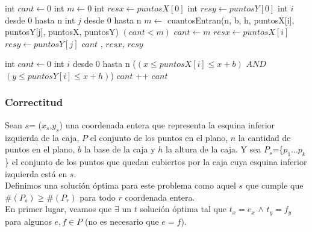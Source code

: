 \begin{algorithm}[H]
\caption{} 
\begin{codebox}
\li int $cant \gets 0$
\li int $m \gets 0$
\li int $resx \gets puntosX[0]$
\li int $resy \gets puntosY[0]$
\li \For int $i$ desde 0 hasta n \Do
\li		\For int $j$ desde 0 hasta n \Do
\li 		$m \gets $ cuantosEntran(n, b, h, puntosX[i], puntosY[j], puntosX, puntosY)
\li 		\If $(cant<m)$ 
\li				\Then   $cant \gets m$
\li 					$resx \gets puntosX[i]$
\li 					$resy \gets puntosY[j]$
				\End
			\End
		\End
	\End
\li \Return $cant$ , $resx$, $resy$

\End
\end{codebox}
\end{algorithm}


\begin{algorithm}[H]
\caption{} 
\begin{codebox}
\li int $cant \gets 0$
\li \For int $i$ desde 0 hasta n \Do
\li 	\If ($(x \leq puntosX[i] \leq x+b)$  $AND$  $(y \leq puntosY[i] \leq x+h)$) \Do
\li 		$cant$ ++		
 		\End
 	\End	
\li \Return $cant $
\End
\end{codebox}
\end{algorithm}

\subsubsection{Correctitud}

\indent Sean $s$= ($x_{s}$,$y_{s}$) una coordenada entera que representa la esquina inferior izquierda de la caja, $P$ el conjunto de los puntos en el plano, $n$ la cantidad de puntos en el plano, $b$ la base de la caja y $h$ la altura de la caja. Y sea $P_{s}$=\{$p_{1}...p_{k}$\} el conjunto de los puntos que quedan cubiertos por la caja cuya esquina inferior izquierda est\'a en $s$.\\

\indent Definimos una soluci\'on \'optima para este problema como aquel $s$ que cumple que $\#(P_{s}) \geq \#(P_{r}) $ para todo $r$ coordenada entera.\\

\indent En primer lugar, veamos que $\exists$ un $t$ soluci\'on \'optima tal que $t_{x} = e_{x}$ $\wedge$ $t_{y}=f_{y}$ para algunos $e,f \in P$ (no es necesario que $e=f$).\\

